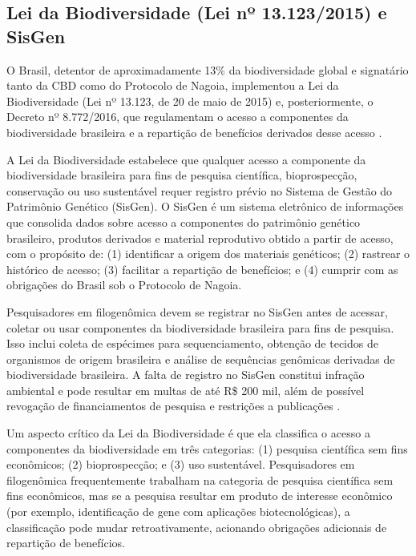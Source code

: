 \subsection{Lei da Biodiversidade (Lei nº 13.123/2015) e SisGen}

O Brasil, detentor de aproximadamente 13\% da biodiversidade global e signatário tanto da CBD como do Protocolo de Nagoia, implementou a Lei da Biodiversidade (Lei nº 13.123, de 20 de maio de 2015) e, posteriormente, o Decreto nº 8.772/2016, que regulamentam o acesso a componentes da biodiversidade brasileira e a repartição de benefícios derivados desse acesso \parencite{brasil2015, brasil2016}.

A Lei da Biodiversidade estabelece que qualquer acesso a componente da biodiversidade brasileira para fins de pesquisa científica, bioprospecção, conservação ou uso sustentável requer registro prévio no Sistema de Gestão do Patrimônio Genético (SisGen). O SisGen é um sistema eletrônico de informações que consolida dados sobre acesso a componentes do patrimônio genético brasileiro, produtos derivados e material reprodutivo obtido a partir de acesso, com o propósito de: (1) identificar a origem dos materiais genéticos; (2) rastrear o histórico de acesso; (3) facilitar a repartição de benefícios; e (4) cumprir com as obrigações do Brasil sob o Protocolo de Nagoia.

Pesquisadores em filogenômica devem se registrar no SisGen antes de acessar, coletar ou usar componentes da biodiversidade brasileira para fins de pesquisa. Isso inclui coleta de espécimes para sequenciamento, obtenção de tecidos de organismos de origem brasileira e análise de sequências genômicas derivadas de biodiversidade brasileira. A falta de registro no SisGen constitui infração ambiental e pode resultar em multas de até R\$ 200 mil, além de possível revogação de financiamentos de pesquisa e restrições a publicações \parencite{brasil2015}.

Um aspecto crítico da Lei da Biodiversidade é que ela classifica o acesso a componentes da biodiversidade em três categorias: (1) pesquisa científica sem fins econômicos; (2) bioprospecção; e (3) uso sustentável. Pesquisadores em filogenômica frequentemente trabalham na categoria de pesquisa científica sem fins econômicos, mas se a pesquisa resultar em produto de interesse econômico (por exemplo, identificação de gene com aplicações biotecnológicas), a classificação pode mudar retroativamente, acionando obrigações adicionais de repartição de benefícios.

